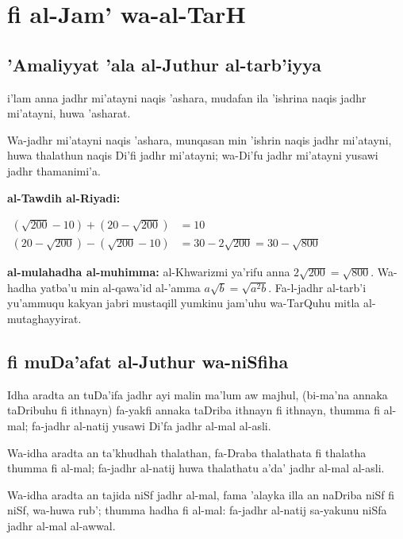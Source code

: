 \documentclass[11pt,a4paper]{book}
\begin{document}
\newpage

\chapter{fi al-Jam' wa-al-TarH}
\label{ch:addition}

\section{'Amaliyyat 'ala al-Juthur al-tarb'iyya}

\begin{originaltext}
i'lam anna jadhr mi'atayni naqis 'ashara, mudafan ila 'ishrina
naqis jadhr mi'atayni, huwa 'asharat.

Wa-jadhr mi'atayni naqis 'ashara, munqasan min 'ishrin naqis jadhr
mi'atayni, huwa thalathun naqis Di'fi jadhr mi'atayni; wa-Di'fu
jadhr mi'atayni yusawi jadhr thamanimi'a.
\end{originaltext}

\begin{mathexplain}
\textbf{al-Tawdih al-Riyadi:}

\begin{center}
$\begin{aligned}
  (\sqrt{200} - 10) + (20 - \sqrt{200}) &= 10 \\
  (20 - \sqrt{200}) - (\sqrt{200} - 10) &= 30 - 2\sqrt{200} = 30 - \sqrt{800}
\end{aligned}$
\end{center}

\textbf{al-mulahadha al-muhimma:} al-Khwarizmi ya'rifu anna
$2\sqrt{200} = \sqrt{800}$. Wa-hadha yatba'u min al-qawa'id al-'amma
$a\sqrt{b} = \sqrt{a^2 b}$. Fa-l-jadhr al-tarb'i yu'ammuqu kakyan
jabri mustaqill yumkinu jam'uhu wa-TarQuhu mitla al-mutaghayyirat.
\end{mathexplain}

\section{fi muDa'afat al-Juthur wa-niSfiha}

\begin{originaltext}
Idha aradta an tuDa'ifa jadhr ayi malin ma'lum aw majhul,
(bi-ma'na annaka taDribuhu fi ithnayn) fa-yakfi annaka taDriba
ithnayn fi ithnayn, thumma fi al-mal; fa-jadhr al-natij yusawi
Di'fa jadhr al-mal al-asli.

Wa-idha aradta an ta'khudhah thalathan, fa-Draba thalathata fi
thalatha thumma fi al-mal; fa-jadhr al-natij huwa thalathatu
a'da' jadhr al-mal al-asli.

Wa-idha aradta an tajida niSf jadhr al-mal, fama 'alayka illa an
naDriba niSf fi niSf, wa-huwa rub'; thumma hadha fi al-mal:
fa-jadhr al-natij sa-yakunu niSfa jadhr al-mal al-awwal.
\end{originaltext}
\end{document}

